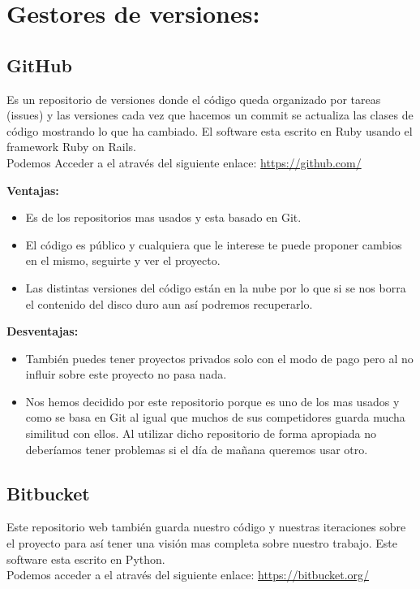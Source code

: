 \section{Gestores de versiones:}
\subsection{GitHub}
Es un repositorio de versiones donde el código queda organizado por tareas (issues) y las versiones cada vez que hacemos un commit se actualiza las clases de código mostrando lo que ha cambiado.
El software esta escrito en Ruby usando el framework Ruby on Rails.\\
Podemos Acceder a el através del siguiente enlace: 
\url{https://github.com/}



\textbf{Ventajas:}

\begin{itemize}
\item Es de los repositorios mas usados y esta basado en Git.

\item El código es público y cualquiera que le interese te puede proponer cambios en el mismo, seguirte y ver el proyecto.

\item Las distintas versiones del código están en la nube por lo que si se nos borra el contenido del disco duro aun así podremos recuperarlo.
\end{itemize}

\textbf{Desventajas:}

\begin{itemize}
\item También puedes tener proyectos privados solo con el modo de pago pero al no influir sobre este proyecto no pasa nada.

\item Nos hemos decidido por este repositorio porque es uno de los mas usados y como se basa en Git al igual que muchos de sus competidores guarda mucha similitud con ellos.
Al utilizar dicho repositorio de forma apropiada no deberíamos tener problemas si el día de mañana queremos usar otro.
\end{itemize}

\subsection{Bitbucket}
Este repositorio web también guarda nuestro código y nuestras iteraciones sobre el proyecto para así tener una visión mas completa sobre nuestro trabajo.
Este software esta escrito en Python.\\
Podemos acceder a el através del siguiente enlace: 
\url{https://bitbucket.org/}


